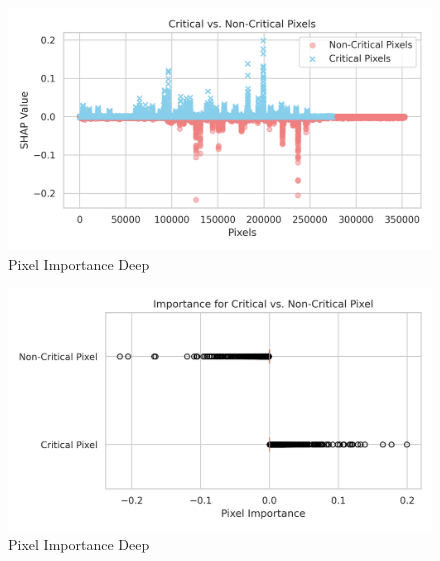 \documentclass[10pt, conference, a4paper, final]{IEEEtran}
\begin{document}
 
        \begin{figure}
            \centering
            \includegraphics[width=0.9\linewidth]{deepexplainer/ttest.png}
            \caption{Pixel Importance Deep}
        \end{figure}
     
        \begin{figure}
            \centering
            \includegraphics[width=0.9\linewidth]{deepexplainer/ttest2.png}
            \caption{Pixel Importance Deep}
        \end{figure}

        


\end{document}
